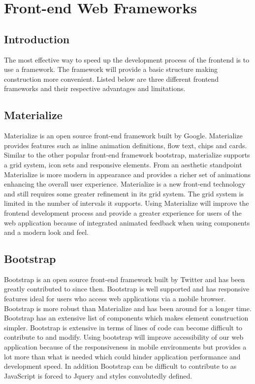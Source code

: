 \documentclass[onecolumn, draftclsnofoot,10pt, compsoc]{IEEEtran}
\begin{document}
\section{Front-end Web Frameworks}
\subsection{Introduction}
The most effective way to speed up the development process of the frontend is to use a framework. The framework will provide a basic structure making construction more convenient. Listed below are three different frontend frameworks and their respective advantages and limitations. 
\subsection{Materialize}
Materialize is an open source front-end framework built by Google. Materialize provides features such as inline animation definitions, flow text, chips and cards. Similar to the other popular front-end framework bootstrap, materialize supports a grid system, icon sets and responsive elements. From an aesthetic standpoint Materialize is more modern in appearance and provides a richer set of animations enhancing the overall user experience. Materialize is a new front-end technology and still requires some greater refinement in its grid system. The grid system is limited in the number of intervals it supports. Using Materialize will improve the frontend development process and provide a greater experience for users of the web application because of integrated animated feedback when using components and a modern look and feel. 
\subsection{Bootstrap}
Bootstrap is an open source front-end framework built by Twitter and has been greatly contributed to since then. Bootstrap is well supported and has responsive features ideal for users who access web applications via a mobile browser. Bootstrap is more robust than Materialize and has been around for a longer time. Bootstrap has an extensive list of components which makes element construction simpler. Bootstrap is extensive in terms of lines of code can become difficult to contribute to and modify. Using bootstrap will improve accessibility of our web application because of the responsiveness in mobile environments but provides a lot more than what is needed which could hinder application performance and development speed. In addition Bootstrap can be difficult to contribute to as JavaScript is forced to Jquery and styles convolutedly defined. 
\end{document}

